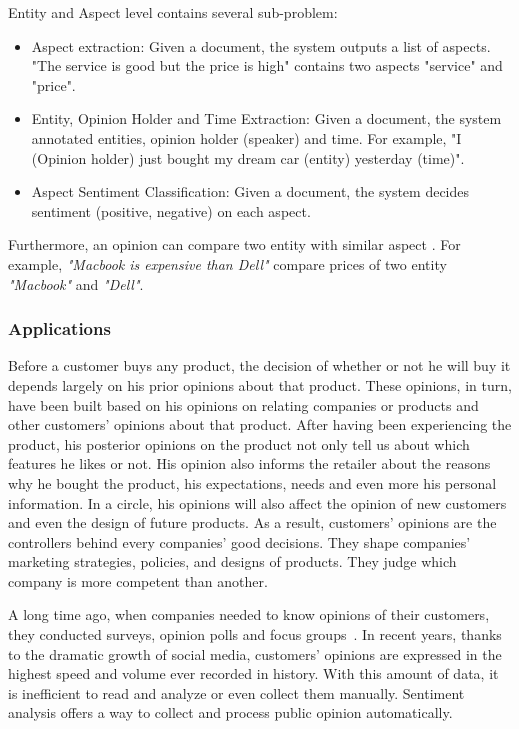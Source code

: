 Entity and Aspect level contains several sub-problem:
\begin{itemize}
    \item Aspect extraction: Given a document, the system outputs a list of aspects. "The service is good but the price is high" contains two aspects "service" and "price".
    \item Entity, Opinion Holder and Time Extraction: Given a document, the system annotated entities, opinion holder (speaker) and time. For example, "I (Opinion holder) just bought my dream car (entity) yesterday (time)".
    \item Aspect Sentiment Classification: Given a document, the system decides sentiment (positive, negative) on each aspect.
\end{itemize}

 Furthermore, an opinion can compare two entity with similar aspect \cite{jindal2006mining}. For example, \textit{"Macbook is expensive than Dell"} compare prices of two entity \textit{"Macbook"} and \textit{"Dell"}.

\subsubsection{Applications}
Before a customer buys any product, the decision of whether or not he will buy it depends largely on his prior opinions about that product.
These opinions, in turn, have been built based on his opinions on relating companies or products and other customers' opinions about that product.
After having been experiencing the product, his posterior opinions on the product not only tell us about which features he likes or not.
His opinion also informs the retailer about the reasons why he bought the product, his expectations, needs and even more his personal information.
In a circle, his opinions will also affect the opinion of new customers and even the design of future products.
As a result, customers' opinions are the controllers behind every companies' good decisions.
They shape companies' marketing strategies, policies, and designs of products.
They judge which company is more competent than another.

A long time ago, when companies needed to know opinions of their customers, they conducted surveys, opinion polls and focus groups~\cite{liu2012sentiment}.
In recent years, thanks to the dramatic growth of social media, customers' opinions are expressed in the highest speed and volume ever recorded in history.
With this amount of data, it is inefficient to read and analyze or even collect them manually. Sentiment analysis offers a way to collect and process public opinion automatically.

